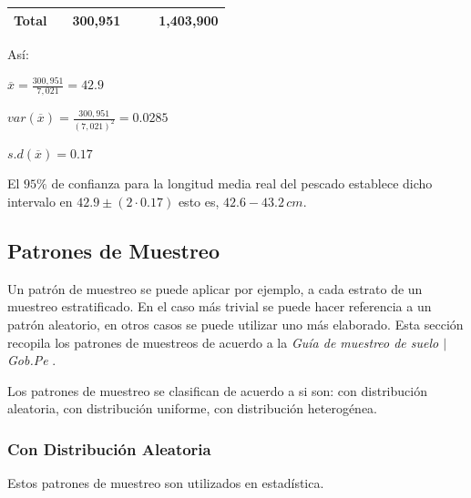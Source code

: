 \documentclass[conference]{IEEEtran}
\begin{document}
\begin{table}[H]
\begin{tabular}{|l|l|l|l|l|l|}
\rowcolor[HTML]{FFCE93} 
Total                                                            &                                                             & 300,951                                                        &                                                                 &                                                                             & 1,403,900                         \\ \hline
\end{tabular}
\end{table}


Así:

\bigbreak

$\overline{x} = \frac{300,951}{7,021} = 42.9$

\bigbreak

$var(\overline{x}) = \frac{300,951}{(7,021)^2} = 0.0285$

\bigbreak

$s.d(\overline{x}) = 0.17$

\bigbreak

El $95\%$ de confianza para la longitud media real del pescado establece dicho intervalo en $42.9 \pm (2 \cdot 0.17)$ esto es, $42.6-43.2 \, cm$.

\subsection{Patrones de Muestreo}

Un patrón de muestreo se puede aplicar por ejemplo, a cada estrato de un muestreo estratificado. En el caso más trivial se puede hacer referencia a un patrón aleatorio, en otros casos se puede utilizar uno más elaborado. Esta sección recopila los patrones de muestreos de acuerdo a la \textit{Guía de muestreo de suelo $\mid$ Gob.Pe} \cite{gobpe-ministerio-del-ambiente-2014}.

\bigbreak

Los patrones de muestreo se clasifican de acuerdo a si son:  con distribución aleatoria, con distribución uniforme, con distribución heterogénea.

\subsubsection{Con Distribución Aleatoria}

Estos patrones de muestreo son utilizados en estadística.

\bigbreak
\end{document}
